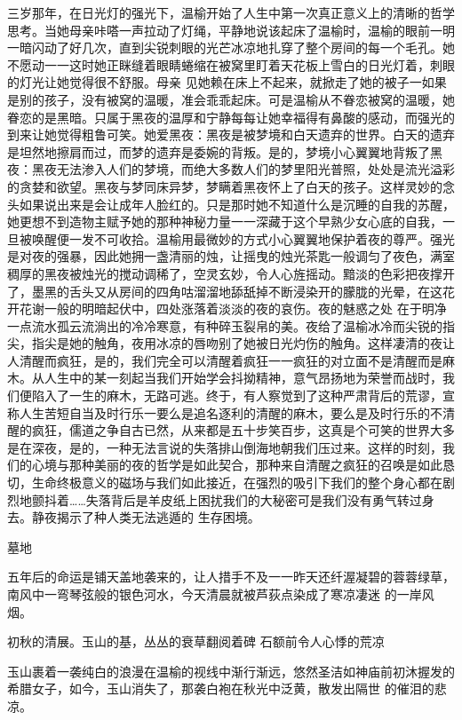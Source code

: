 \documentclass{article}
\begin{document}
三岁那年，在日光灯的强光下，温榆开始了人生中第一次真正意义上的清晰的哲学思考。当她母亲咔嗒一声拉动了灯绳，平静地说该起床了温榆时，温榆的眼前一明一暗闪动了好几次，直到尖锐刺眼的光芒冰凉地扎穿了整个房间的每一个毛孔。她不愿动一一这时她正眯缝着眼睛蜷缩在被窝里盯着天花板上雪白的日光灯着，刺眼的灯光让她觉得很不舒服。母亲
\newpage
见她赖在床上不起来，就掀走了她的被子一如果是别的孩子，没有被窝的温暖，准会乖乖起床。可是温榆从不眷恋被窝的温暖，她眷恋的是黑暗。只属于黑夜的温厚和宁静每每让她幸福得有鼻酸的感动，而强光的到来让她觉得粗鲁可笑。她爱黑夜：黑夜是被梦境和白天遗弃的世界。白天的遗弃是坦然地擦肩而过，而梦的遗弃是委婉的背叛。是的，梦境小心翼翼地背叛了黑夜：黑夜无法渗入人们的梦境，而绝大多数人们的梦里阳光普照，处处是流光溢彩的贪婪和欲望。黑夜与梦同床异梦，梦瞒着黑夜怀上了白天的孩子。这样灵妙的念头如果说出来是会让成年人脸红的。只是那时她不知道什么是沉睡的自我的苏醒，她更想不到造物主赋予她的那种神秘力量一一深藏于这个早熟少女心底的自我，一旦被唤醒便一发不可收拾。温榆用最微妙的方式小心翼翼地保护着夜的尊严。强光是对夜的强暴，因此她拥一盏清丽的烛，让摇曳的烛光茶匙一般调匀了夜色，满室稠厚的黑夜被烛光的搅动调稀了，空灵玄妙，令人心旌摇动。黯淡的色彩把夜撑开了，墨黑的舌头又从房间的四角咕溜溜地舔舐掉不断浸染开的朦胧的光晕，在这花开花谢一般的明暗起伏中，四处涨落着淡淡的夜的哀伤。夜的魅惑之处
\newpage
在于明净一点流水孤云流淌出的冷冷寒意，有种碎玉裂帛的美。夜给了温榆冰冷而尖锐的指尖，指尖是她的触角，夜用冰凉的唇吻别了她被日光灼伤的触角。这样凄清的夜让人清醒而疯狂，是的，我们完全可以清醒着疯狂一一疯狂的对立面不是清醒而是麻木。从人生中的某一刻起当我们开始学会抖拗精神，意气昂扬地为荣誉而战时，我们便陷入了一生的麻木，无路可逃。终于，有人察觉到了这种严肃背后的荒谬，宣称人生苦短自当及时行乐一要么是追名逐利的清醒的麻木，要么是及时行乐的不清醒的疯狂，儒道之争自古已然，从来都是五十步笑百步，这真是个可笑的世界大多是在深夜，是的，一种无法言说的失落排山倒海地朝我们压过来。这样的时刻，我们的心境与那种美丽的夜的哲学是如此契合，那种来自清醒之疯狂的召唤是如此恳切，生命终极意义的磁场与我们如此接近，在强烈的吸引下我们的整个身心都在剧烈地颤抖着……失落背后是羊皮纸上困扰我们的大秘密可是我们没有勇气转过身去。静夜揭示了种人类无法逃遁的
生存困境。 


\newpage

墓地 

五年后的命运是铺天盖地袭来的，让人措手不及一一昨天还纤渥凝碧的蓉蓉绿草，南风中一弯琴弦般的银色河水，今天清晨就被芦荻点染成了寒凉凄迷
的一岸风烟。 

初秋的清展。玉山的基，丛丛的衰草翻阅着碑
石额前令人心悸的荒凉 

玉山裹着一袭纯白的浪漫在温榆的视线中渐行渐远，悠然圣洁如神庙前初沐握发的希腊女子，如今，玉山消失了，那袭白袍在秋光中泛黄，散发出隔世
的催泪的悲凉。 
\end{document}
